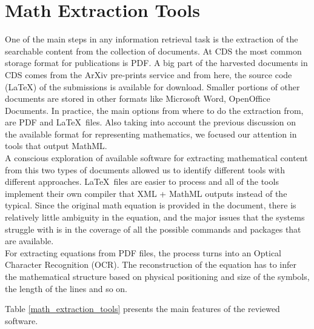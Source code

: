 \section{Math Extraction Tools}
One of the main steps in any information retrieval task is the extraction of the searchable content from the collection of documents. At CDS the most common storage format for publications is PDF. A big part of the harvested documents in CDS comes from the ArXiv pre-prints service and from here, the source code (\LaTeX) of the submissions is available for download. Smaller portions of other documents are stored in other formats like Microsoft Word, OpenOffice Documents.
In practice, the main options from where to do the extraction from, are PDF and \LaTeX\  files. Also taking into account the previous discussion on the available format for representing mathematics, we focused our attention in tools that output MathML.  \\
A conscious exploration of available software for extracting mathematical content from this two types of documents allowed us to identify different tools with different approaches. 
\LaTeX\  files are easier to process and all of the tools implement their own compiler that XML + MathML outputs instead of the typical. Since the original math equation is provided in the document, there is relatively little ambiguity in the equation, and the major issues that the systems struggle with is in the coverage of all the possible commands and packages that are available. \\
For extracting equations from PDF files, the process turns into an Optical Character Recognition (OCR). The reconstruction of the equation has to infer the mathematical structure based on physical positioning and size of the symbols, the length of the lines and so on.

Table \ref{math_extraction_tools} presents the main features of the reviewed software. 

